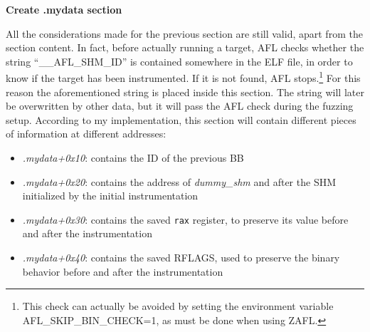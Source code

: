 \begin{center}
\textbf{Create .mydata section}    
\end{center}
All the considerations made for the previous section are still valid, apart from the section content.
In fact, before actually running a target, AFL checks whether the string ``\_\_AFL\_SHM\_ID'' is contained somewhere in the
\gls{ELF} file, in order to know if the target has been instrumented. If it is not found, AFL stops.\footnote{
    This check can actually be avoided by setting the environment variable AFL\_SKIP\_BIN\_CHECK=1, as must be done when using ZAFL.
}
For this reason the aforementioned string is placed inside this section.
The string will later be overwritten by other data, but it will pass the AFL check during the fuzzing setup.
According to my implementation, this section will contain different pieces of information at different addresses:
\begin{itemize}
    \item \textit{.mydata+0x10}: contains the ID of the previous \gls{BB}
    \item \textit{.mydata+0x20}: contains the address of \textit{dummy\_shm} and after 
        the \gls{SHM} initialized by the initial instrumentation 
    \item \textit{.mydata+0x30}: contains the saved \texttt{rax} register, to preserve its value before and after the instrumentation
    \item \textit{.mydata+0x40}: contains the saved RFLAGS, used to preserve the binary behavior before and after the instrumentation
\end{itemize}

